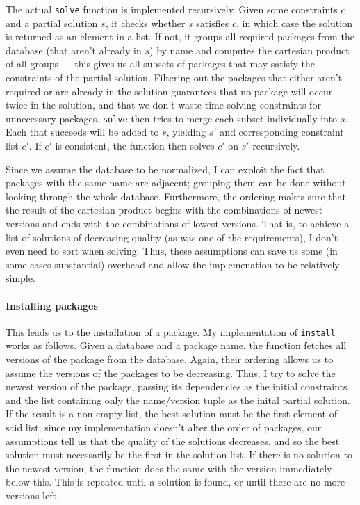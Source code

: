 The actual \texttt{solve} function is implemented recursively. Given some constraints $c$ and a partial solution $s$, it checks whether $s$ satisfies $c$, in which case the solution is returned as an element in a list. If not, it groups all required packages from the database (that aren't already in $s$) by name and computes the cartesian product of all groups --- this gives us all subsets of packages that may satisfy the constraints of the partial solution. Filtering out the packages that either aren't required or are already in the solution guarantees that no package will occur twice in the solution, and that we don't waste time solving constraints for unnecessary packages. \texttt{solve} then tries to merge each subset individually into $s$. Each that succeeds will be added to $s$, yielding $s'$ and corresponding constraint list $c'$. If $c'$ is consistent, the function then solves $c'$ on $s'$ recursively.

Since we assume the database to be normalized, I can exploit the fact that packages with the same name are adjacent; grouping them can be done without looking through the whole database. Furthermore, the ordering makes sure that the result of the cartesian product begins with the combinations of newest versions and ends with the combinations of lowest versions. That is, to achieve a list of solutions of decreasing quality (as was one of the requirements), I don't even need to sort when solving. Thus, these assumptions can save us some (in some cases substantial) overhead and allow the implemenation to be relatively simple.


\paragraph{Installing packages}
This leads us to the installation of a package. My implementation of \texttt{install} works as follows. Given a database and a package name, the function fetches all versions of the package from the database. Again, their ordering allows us to assume the versions of the packages to be decreasing. Thus, I try to solve the newest version of the package, passing its dependencies as the initial constraints and the list containing only the name/version tuple as the inital partial solution. If the result is a non-empty list, the best solution must be the first element of said list; since my implementation doesn't alter the order of packages, our assumptions tell us that the quality of the solutions decreases, and so the best solution must necessarily be the first in the solution list. If there is no solution to the newest version, the function does the same with the version immediately below this. This is repeated until a solution is found, or until there are no more versions left.


